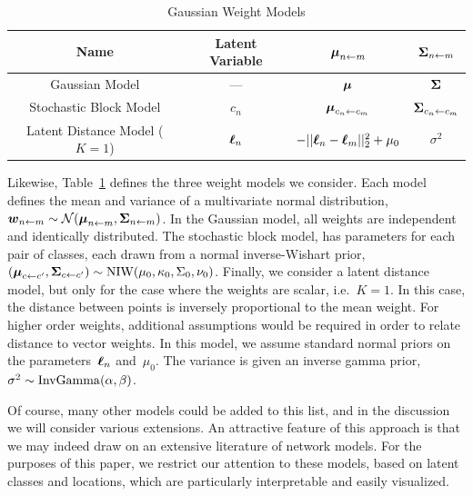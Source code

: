 \begin{table}
\begin{center}
\begin{tabular}{c|c|c|c}
Name & Latent Variable & $\boldsymbol{\mu}_{n \leftarrow m}$ & $\boldsymbol{\Sigma}_{n \leftarrow m}$\\
\hline
Gaussian Model & --- & $\boldsymbol{\mu}$ & $\boldsymbol{\Sigma}$ \\
Stochastic Block Model & $c_n$ & $\boldsymbol{\mu}_{c_n \leftarrow c_m}$ & $\boldsymbol{\Sigma}_{c_n \leftarrow c_m}$ \\
Latent Distance Model (${K=1}$) & $\boldsymbol{\ell}_n$ & $-||\boldsymbol{\ell}_n - \boldsymbol{\ell}_m||_2^2 + \mu_0$ & $\sigma^2$
\end{tabular}
\end{center}
\caption{Gaussian Weight Models}
\label{tab:W_models}
\end{table}

Likewise, Table~\ref{tab:W_models} defines the three weight models we
consider.  Each model defines the mean and variance of a multivariate
normal distribution,~$\boldsymbol{w}_{n \leftarrow m} \sim \mathcal{N}(\boldsymbol{\mu}_{n \leftarrow
  m}, \boldsymbol{\Sigma}_{n \leftarrow m})$.  In the Gaussian model, all weights are
independent and identically distributed.  The stochastic block model,
has parameters for each pair of classes, each drawn from a normal
inverse-Wishart prior,~$(\boldsymbol{\mu}_{c \leftarrow c'}, \boldsymbol{\Sigma}_{c \leftarrow c'}) \sim
\mathrm{NIW}(\mu_0, \kappa_0, \Sigma_0, \nu_0)$. Finally, we
consider a latent distance model, but only for the case where the
weights are scalar, i.e.~$K=1$. In this case, the distance between
points is inversely proportional to the mean weight.  For higher order
weights, additional assumptions would be required in order to relate
distance to vector weights. In this model, we assume standard normal
priors on the parameters~$\boldsymbol{\ell}_n$ and~$\mu_0$.  The variance is given
an inverse gamma prior,~$\sigma^2 \sim \mathrm{InvGamma}(\alpha, \beta)$.

Of course, many other models could be added to this list, and in the
discussion we will consider various extensions. An attractive feature
of this approach is that we may indeed draw on an extensive literature
of network models. For the purposes of this paper, we restrict our
attention to these models, based on latent classes and locations,
which are particularly interpretable and easily visualized.

